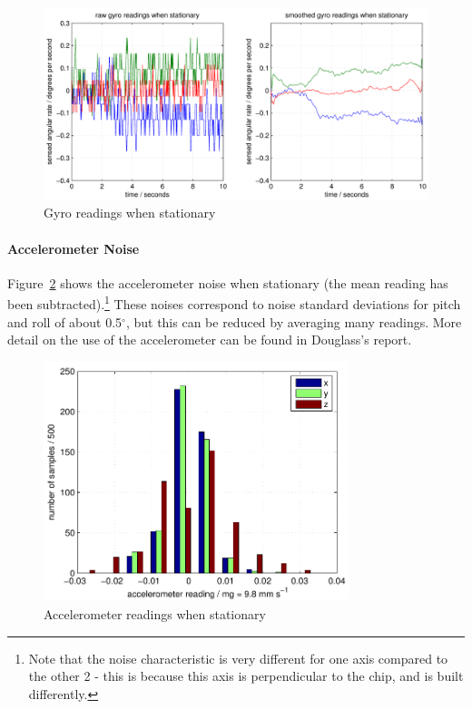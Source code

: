 \documentclass{IIBproject}
\begin{document}
\begin{figure}[htpb]
  \begin{center}
    \includegraphics[width=13cm]{figures/gyro_stat.pdf}
    \end{center}
    \caption{Gyro readings when stationary}
    \label{fig:gyro_stat}
    \end{figure}

\paragraph{Accelerometer Noise}
Figure~\ref{fig:acc_stat} shows the accelerometer noise when stationary (the
mean reading has been subtracted).\footnote{Note that the noise characteristic is very
different for one axis compared to the other 2 - this is because this axis is
perpendicular to the chip, and is built differently.} These noises correspond
to noise standard deviations for pitch and roll of about 0.5$^\circ$, but this
can be reduced by averaging many readings. More detail on the use of the
accelerometer can be found in Douglass's report.

\begin{figure}[htpb]
  \begin{center}
    \includegraphics[height=7cm]{figures/acc_stat.pdf}
    \end{center}
    \caption{Accelerometer readings when stationary}
    \label{fig:acc_stat}
    \end{figure}
\end{document}

